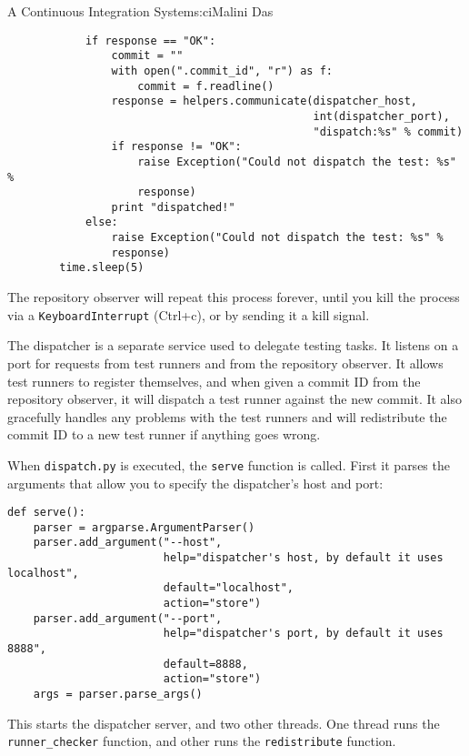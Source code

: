 \begin{aosachapter}{A Continuous Integration System}{s:ci}{Malini Das}
\begin{verbatim}
            if response == "OK":
                commit = ""
                with open(".commit_id", "r") as f:
                    commit = f.readline()
                response = helpers.communicate(dispatcher_host,
                                               int(dispatcher_port),
                                               "dispatch:%s" % commit)
                if response != "OK":
                    raise Exception("Could not dispatch the test: %s" %
                    response)
                print "dispatched!"
            else:
                raise Exception("Could not dispatch the test: %s" %
                response)
        time.sleep(5)
\end{verbatim}

The repository observer will repeat this process forever, until you kill
the process via a \texttt{KeyboardInterrupt} (Ctrl+c), or by sending it
a kill signal.

\label{the-dispatcher-dispatcher.py}

The dispatcher is a separate service used to delegate testing tasks. It
listens on a port for requests from test runners and from the repository
observer. It allows test runners to register themselves, and when given
a commit ID from the repository observer, it will dispatch a test runner
against the new commit. It also gracefully handles any problems with the
test runners and will redistribute the commit ID to a new test runner if
anything goes wrong.

When \texttt{dispatch.py} is executed, the \texttt{serve} function is
called. First it parses the arguments that allow you to specify the
dispatcher's host and port:

\begin{verbatim}
def serve():
    parser = argparse.ArgumentParser()
    parser.add_argument("--host",
                        help="dispatcher's host, by default it uses localhost",
                        default="localhost",
                        action="store")
    parser.add_argument("--port",
                        help="dispatcher's port, by default it uses 8888",
                        default=8888,
                        action="store")
    args = parser.parse_args()
\end{verbatim}

This starts the dispatcher server, and two other threads. One thread
runs the \texttt{runner\_checker} function, and other runs the
\texttt{redistribute} function.


\end{aosachapter}
